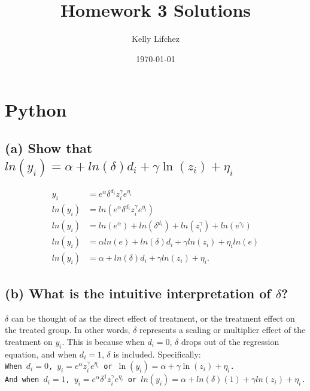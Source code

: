 \documentclass{article}
\title{Homework 3 Solutions}
\author{Kelly Lifchez}
\date{\today}
\begin{document}
  
\maketitle


\section{Python}

\subsection*{(a) Show that $ln(y_i) = \alpha + ln(\delta)d_i + \gamma\ln(z_i) + \eta_i$}

\begin{align}
        y_i &= e^{\alpha} \delta^{d_i} z_i^{\gamma}  e^{\eta_i} \\
        ln(y_i) &= ln\left( e^{\alpha} \delta^{d_i} z_i^{\gamma}  e^{\eta_i} \right) \\
        ln(y_i) & = ln\left( e^{\alpha} \right) + ln\left( \delta^{d_i} \right) + ln\left( z_i^\gamma \right) + ln\left( e^{\gamma_i} \right) \\
        ln(y_i) & = \alpha ln(e) + ln(\delta)d_i + \gamma ln(z_i) + \eta_i ln(e) \\
        ln(y_i) & = \alpha + ln(\delta) d_i + \gamma ln(z_i) + \eta_i.
    \end{align}

\subsection*{(b) What is the intuitive interpretation of $\delta$?}

$\delta$ can be thought of as the direct effect of treatment, or the treatment effect on the treated group. In other words, $\delta$ represents a scaling or multiplier effect of the treatment on $y_i$. This is because when $d_i = 0$, $\delta$ drops out of the regression equation, and when $d_i = 1$, $\delta$ is included. Specifically: \\

\texttt{When $d_i = 0$, $y_i = e^{\alpha} z_i^{\gamma} e^{\eta_i}$ or $ \ln(y_i) = \alpha + \gamma \ln(z_i) + \eta_i$.} \\

\texttt{And when $d_i = 1$, $y_i = e^{\alpha} \delta^{1} z_i^{\gamma}  e^{\eta_i}$ or $ln(y_i) = \alpha + ln(\delta) (1) + \gamma ln(z_i) + \eta_i$.} \\
\end{document}
